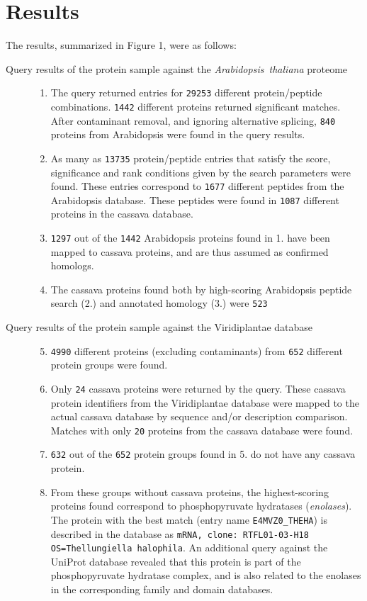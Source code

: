 \documentclass[oneside, a4paper, final]{memoir} %
\begin{document}
\section{Results}
	The results, summarized in Figure 1, were as follows:
	\begin{description}
		\item[Query results of the protein sample against the \emph{Arabidopsis~thaliana} proteome]\hfill
			\begin{enumerate}
				\item The query returned entries for \texttt{29253} dif{}ferent protein/peptide combinations. \texttt{1442} dif{}ferent proteins returned signif{}icant matches.
				After contaminant removal, and ignoring alternative splicing, \texttt{840} proteins from Arabidopsis were found in the query results.
				\item As many as \texttt{13735} protein/peptide entries that satisfy the score, signif{}icance and rank conditions given by the search parameters were found.
				These entries correspond to \texttt{1677} dif{}ferent peptides from the Arabidopsis database.
				These peptides were found in \texttt{1087} dif{}ferent proteins in the cassava database.
				\item \texttt{1297} out of the \texttt{1442} Arabidopsis proteins found in 1. have been mapped to cassava proteins,
				and are thus assumed as conf{}irmed homologs.
				\item The cassava proteins found both by high-scoring Arabidopsis peptide search (2.) and annotated homology (3.) were \texttt{523}
			\end{enumerate}
		\item[Query results of the protein sample against the Viridiplantae database]\hfill
			\begin{enumerate}
				\setcounter{enumi}{4}
				\item \texttt{4990} dif{}ferent proteins (excluding contaminants) from \texttt{652} dif{}ferent protein groups were found.
				\item Only \texttt{24} cassava proteins were returned by the query. These cassava protein identifiers from the Viridiplantae database were
				mapped to the actual cassava database by sequence and/or description comparison. Matches with only \texttt{20} proteins from the cassava database were found.
				\item \texttt{632} out of the \texttt{652} protein groups found in 5. do not have any cassava protein.
				\item From these groups without cassava proteins, the highest-scoring proteins found correspond to phosphopyruvate hydratases (\emph{enolases}).
				The protein with the best match (entry name \texttt{E4MVZ0\_THEHA}) is described in the database as \texttt{mRNA, clone: RTFL01-03-H18 OS=Thellungiella halophila}.
				An additional query against the UniProt\cite{uniprot} database revealed that this protein is part of the phosphopyruvate hydratase complex, and is also related to the
				enolases in the corresponding family and domain databases.


\end{enumerate}
\end{description}
\end{document}
